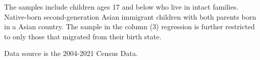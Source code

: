 \begin{table}[H]
{\begin{threeparttable}
\begin{tablenotes}
\item[3] \footnotesize{The samples include children ages 17 and below who live in intact families. 
                      Native-born second-generation Asian immigrant children with both
                      parents born in a Asian country. The sample in the column (3) regression is further restricted to only those that migrated from their birth state.}
\item[4] \footnotesize{Data source is the 2004-2021 Census Data.}
\end{tablenotes}
\end{threeparttable}}
\end{table}
